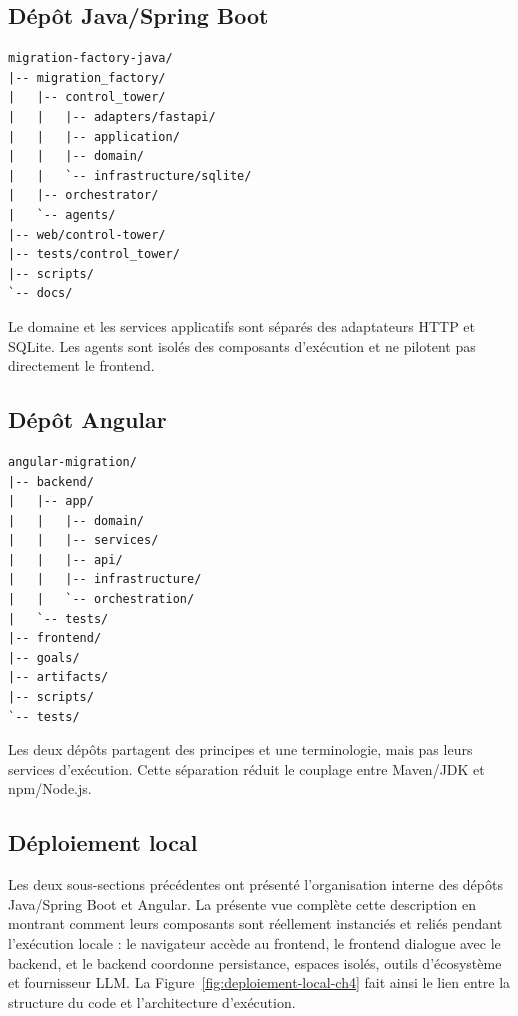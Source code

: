 \subsection{Dépôt Java/Spring Boot}

\begin{verbatim}
migration-factory-java/
|-- migration_factory/
|   |-- control_tower/
|   |   |-- adapters/fastapi/
|   |   |-- application/
|   |   |-- domain/
|   |   `-- infrastructure/sqlite/
|   |-- orchestrator/
|   `-- agents/
|-- web/control-tower/
|-- tests/control_tower/
|-- scripts/
`-- docs/
\end{verbatim}

Le domaine et les services applicatifs sont séparés des adaptateurs HTTP et SQLite. Les agents sont isolés des composants d'exécution et ne pilotent pas directement le frontend.

\subsection{Dépôt Angular}

\begin{verbatim}
angular-migration/
|-- backend/
|   |-- app/
|   |   |-- domain/
|   |   |-- services/
|   |   |-- api/
|   |   |-- infrastructure/
|   |   `-- orchestration/
|   `-- tests/
|-- frontend/
|-- goals/
|-- artifacts/
|-- scripts/
`-- tests/
\end{verbatim}

Les deux dépôts partagent des principes et une terminologie, mais pas leurs services d'exécution. Cette séparation réduit le couplage entre Maven/JDK et npm/Node.js.

\subsection{Déploiement local}

Les deux sous-sections précédentes ont présenté l'organisation interne des dépôts Java/Spring Boot et Angular. La présente vue complète cette description en montrant comment leurs composants sont réellement instanciés et reliés pendant l'exécution locale : le navigateur accède au frontend, le frontend dialogue avec le backend, et le backend coordonne persistance, espaces isolés, outils d'écosystème et fournisseur LLM. La Figure~\ref{fig:deploiement-local-ch4} fait ainsi le lien entre la structure du code et l'architecture d'exécution.

